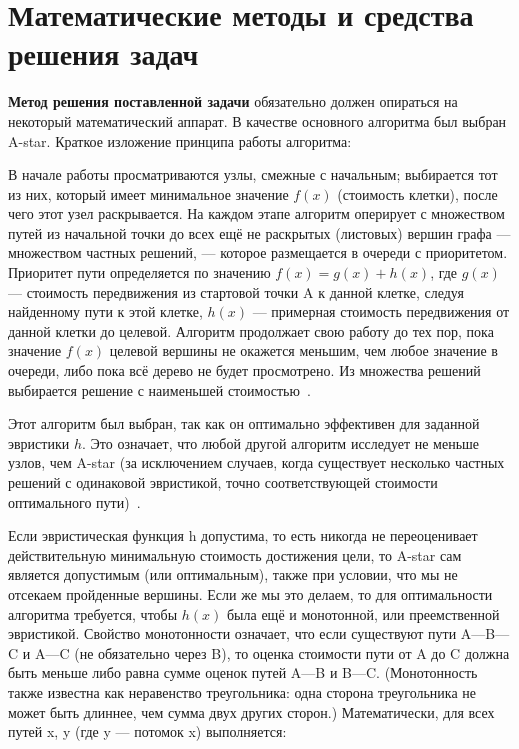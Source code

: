 \documentclass[chapterprefix=true,headings=onelineappendix]{scrartcl}
\begin{document}
\newpage{}
\section{Математические методы и средства решения задач}

\textbf{Метод решения поставленной задачи} обязательно должен опираться на
некоторый математический аппарат. В качестве основного алгоритма был выбран A-star.
Краткое изложение принципа работы алгоритма:

\begin{displayquote}
	В начале работы просматриваются узлы, смежные с начальным; выбирается тот из
	них, который имеет минимальное значение $f(x)$ (стоимость клетки), после чего
	этот узел раскрывается. На каждом этапе алгоритм оперирует с множеством путей
	из начальной точки до всех ещё не раскрытых (листовых) вершин графа —
	множеством частных решений, — которое размещается в очереди с приоритетом.
	Приоритет пути определяется по значению $f(x) = g(x) + h(x)$, где $g(x)$ ---
	стоимость передвижения из стартовой точки A к данной клетке, следуя
	найденному пути к этой клетке, $h(x)$ --- примерная стоимость передвижения от
	данной клетки до целевой. Алгоритм продолжает свою работу до тех пор, пока
	значение $f(x)$ целевой вершины не окажется меньшим, чем любое значение в
	очереди, либо пока всё дерево не будет просмотрено. Из множества решений
	выбирается решение с наименьшей стоимостью~\cite{ЖанЛуи1991,Рассел2006}.
\end{displayquote}

Этот алгоритм был выбран, так как он оптимально эффективен для заданной
эвристики $h$. Это означает, что любой другой алгоритм исследует не меньше
узлов, чем A-star (за исключением случаев, когда существует несколько частных
решений с одинаковой эвристикой, точно соответствующей стоимости оптимального
пути)~\cite{Wikipedia:A-star}.

Если эвристическая функция h допустима, то есть никогда не переоценивает
действительную ми\-ни\-маль\-ную стоимость достижения цели, то A-star сам является
допустимым (или оптимальным), также при условии, что мы не отсекаем пройденные
вершины. Если же мы это делаем, то для оптимальности алгоритма требуется, чтобы
$h(x)$ была ещё и монотонной, или преемственной эвристикой. Свойство монотонности
означает, что если существуют пути A—B—C и A—C (не обязательно через B), то
оценка стоимости пути от A до C должна быть меньше либо равна сумме оценок
путей A—B и B—C. (Монотонность также известна как неравенство треугольника:
одна сторона треугольника не может быть длиннее, чем сумма двух других сторон.)
Математически, для всех путей x, y (где y — потомок x) выполняется:
\end{document}
